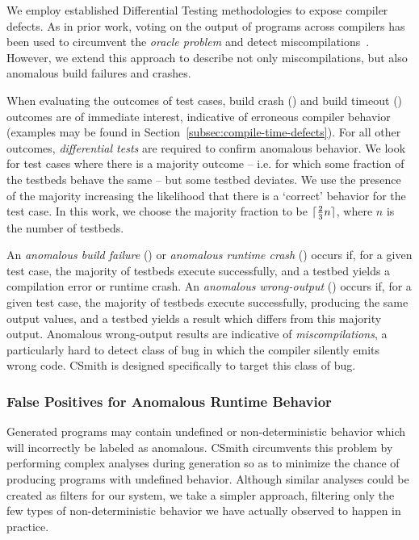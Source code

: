 We employ established Differential Testing methodologies to expose compiler
defects. As in prior work, voting on the output of programs across compilers has
been used to circumvent the \emph{oracle problem} and detect
miscompilations~\cite{McKeeman1998}. However, we extend this approach to
describe not only miscompilations, but also anomalous build failures and
crashes.

When evaluating the outcomes of test cases, build crash (\bc) and build timeout
(\bto) outcomes are of immediate interest, indicative of erroneous compiler
behavior (examples may be found in Section~\ref{subsec:compile-time-defects}).
For all other outcomes, \emph{differential tests} are required to confirm
anomalous behavior. We look for test cases where there is a majority outcome --
i.e. for which some fraction of the testbeds behave the same -- but some testbed
deviates. We use the presence of the majority increasing the likelihood that
there is a `correct' behavior for the test case. In this work, we choose the
majority fraction to be $\lceil\frac{2}{3}n\rceil$, where $n$ is the number of
testbeds.

An \emph{anomalous build failure} (\abf) or \emph{anomalous runtime crash}
(\arc) occurs if, for a given test case, the majority of testbeds execute
successfully, and a testbed yields a compilation error or runtime crash. An
\emph{anomalous wrong-output} (\awo) occurs if, for a given test case, the
majority of testbeds execute successfully, producing the same output values, and
a testbed yields a result which differs from this majority output. Anomalous
wrong-output results are indicative of \emph{miscompilations}, a particularly
hard to detect class of bug in which the compiler silently emits wrong code.
CSmith is designed specifically to target this class of bug.

\subsubsection{False Positives for Anomalous Runtime Behavior}%
\label{subsec:discussions}

Generated programs may contain undefined or non-deterministic behavior which
will incorrectly be labeled as anomalous. CSmith circumvents this problem by
performing complex analyses during generation so as to minimize the chance of
producing programs with undefined behavior. Although similar analyses could be
created as filters for our system, we take a simpler approach, filtering only
the few types of non-deterministic behavior we have actually observed to happen
in practice.

